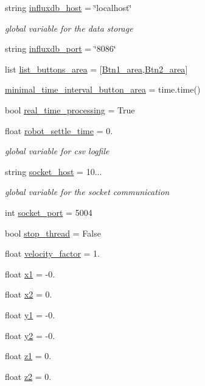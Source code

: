 \begin{DoxyCompactItemize}
string \hyperlink{namespaceRET__config_a5ad590543d5ae7b0a89b3681d33928d8}{influxdb\+\_\+host} = \char`\"{}localhost\char`\"{}
\begin{DoxyCompactList}\small\item\em global variable for the data storage \end{DoxyCompactList}\item 
string \hyperlink{namespaceRET__config_a91cab5b28cd6867b74e2cb9f887b2948}{influxdb\+\_\+port} = \char`\"{}8086\char`\"{}
\item 
list \hyperlink{namespaceRET__config_a25b4602337319d65f44337e6ad1b0487}{list\+\_\+buttons\+\_\+area} = \mbox{[}\hyperlink{namespaceRET__config_a118140d2896d1aff1e3c9355f9deb314}{Btn1\+\_\+area},\hyperlink{namespaceRET__config_a51a4083768cbc17b22a98ad63a7bf851}{Btn2\+\_\+area}\mbox{]}
\item 
\hyperlink{namespaceRET__config_a1cc0506097479f304974f44bc5456f4a}{minimal\+\_\+time\+\_\+interval\+\_\+button\+\_\+area} = time.\+time()
\item 
bool \hyperlink{namespaceRET__config_a4132cf21a6c01ecf59141756ab5f9936}{real\+\_\+time\+\_\+processing} = True
\item 
float \hyperlink{namespaceRET__config_aff247d8ee094bb439dbb098e236455cb}{robot\+\_\+settle\+\_\+time} = 0.
\begin{DoxyCompactList}\small\item\em global variable for csv logfile \end{DoxyCompactList}\item 
string \hyperlink{namespaceRET__config_a2014ea8569b3cda02e44e85f8840eba2}{socket\+\_\+host} = \textquotesingle{}10...\textquotesingle{}
\begin{DoxyCompactList}\small\item\em global variable for the socket communication \end{DoxyCompactList}\item 
int \hyperlink{namespaceRET__config_a08c4648fe1aa34a4fd5ad0097d17237f}{socket\+\_\+port} = 5004
\item 
bool \hyperlink{namespaceRET__config_a94d742b756b055a53df310fd15705ede}{stop\+\_\+thread} = False
\item 
float \hyperlink{namespaceRET__config_a0fee7ae942bb4b6078c6400331aef6f1}{velocity\+\_\+factor} = 1.
\item 
float \hyperlink{namespaceRET__config_a3389d8b95846602e8f94cc15f41e48e9}{x1} = -\/0.
\item 
float \hyperlink{namespaceRET__config_a24d6ffb6e8780eef0c81cd97e3f4fdaf}{x2} = 0.
\item 
float \hyperlink{namespaceRET__config_a9fe80bf4738047a31d7c162807ed85f0}{y1} = -\/0.
\item 
float \hyperlink{namespaceRET__config_a07bcd014e69eddcf4243b2a961014eaf}{y2} = -\/0.
\item 
float \hyperlink{namespaceRET__config_a7da4886c0a2e03b8bb9ed62eb20efb78}{z1} = 0.
\item 
float \hyperlink{namespaceRET__config_a55196b87940893e540ba636218f4eb07}{z2} = 0.
\end{DoxyCompactItemize}


